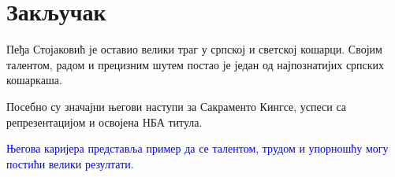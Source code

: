 \documentclass[a4paper]{article}
\begin{document}
\section{Закључак}

Пеђа Стојаковић је оставио велики траг у српској и светској
кошарци. Својим талентом, радом и прецизним шутем постао је
један од најпознатијих српских кошаркаша.

Посебно су значајни његови наступи за Сакраменто Кингсе,
успеси са репрезентацијом и освојена НБА титула.

\textcolor{blue}{Његова каријера представља пример да се
талентом, трудом и упорношћу могу постићи велики резултати.}
\end{document}
